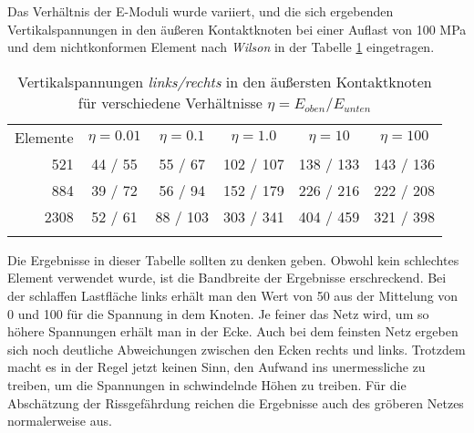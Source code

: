 {{Das Verh\"{a}ltnis der E-Moduli wurde variiert, und die sich ergebenden Vertikalspannungen in den \"{a}u{\ss}eren Kontaktknoten bei einer Auflast von 100 MPa und dem nichtkonformen Element nach {\em Wilson\/} in der Tabelle \ref{Vergleich1} eingetragen.
\begin{table}
\caption{ Vertikalspannungen {\em links/rechts\/} in den \"{a}u{\ss}ersten Kontaktknoten f\"{u}r
verschiedene Verh\"{a}ltnisse $\eta = E_{oben}/E_{unten}$} \label{Vergleich1} {\small
\begin{tabular}{r c c c c c}
\noalign{\hrule\smallskip}
Elemente & $\eta=0.01$ &  $\eta=0.1$&  $\eta=1.0$ &   $\eta=10$ &  $\eta=100$ \\
\noalign{\hrule\smallskip}
521  &    44 / 55 &    55 / 67 &  102 / 107 &  138 / 133 &  143 / 136 \\
\noalign{\hrule\smallskip}
884  &    39 / 72 &    56 / 94 &  152 / 179 &  226 / 216 &  222 / 208 \\
\noalign{\hrule\smallskip}
2308 &    52 / 61 &   88 / 103 &  303 / 341 &  404 / 459 &  321 / 398 \\
\noalign{\hrule\smallskip}
\end{tabular}
} %
\end{table}
Die Ergebnisse in dieser Tabelle sollten zu denken geben. Obwohl kein schlechtes Element verwendet wurde, ist die Bandbreite der Ergebnisse erschreckend. Bei der schlaffen Lastfl\"{a}che links erh\"{a}lt man den Wert von 50 aus der Mittelung von 0 und 100 f\"{u}r die Spannung in dem Knoten. Je feiner das Netz wird, um so h\"{o}here Spannungen erh\"{a}lt man in der Ecke. Auch bei dem feinsten Netz ergeben sich noch deutliche Abweichungen zwischen den Ecken rechts und links. Trotzdem macht es in der Regel jetzt keinen Sinn, den Aufwand ins unermessliche zu treiben, um die Spannungen in schwindelnde H\"{o}hen zu treiben. F\"{u}r die Absch\"{a}tzung der Rissgef\"{a}hrdung reichen die Ergebnisse auch des gr\"{o}beren Netzes normalerweise aus.

}}
